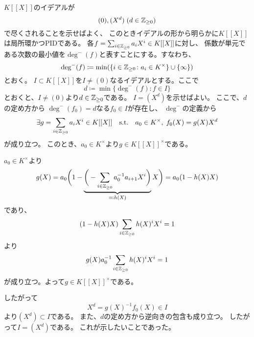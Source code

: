 \documentclass[report]{jlreq}
\begin{document}
\begin{answer}
    $K[[X]]$のイデアルが
    \begin{equation}
        (0), (X^d)\; (d \in \mathbb{Z}_{\ge 0})
    \end{equation}
    で尽くされることを示せばよく、
    このときイデアルの形から明らかに$K[[X]]$は局所環かつPIDである。
    各$f = \sum_{i \in \mathbb{Z}_{\ge 0}} a_i X^i \in K[[X]]$に対し、
    係数が単元である次数の最小値を$\deg^-(f)$と表すことにする。すなわち、
    \begin{equation}
        \operatorname{deg}^-(f) \coloneqq \min (\{
            i \in \mathbb{Z}_{\ge 0} \colon a_i \in K^\times
        \} \cup \{ \infty \})
    \end{equation}
    とおく。
    $I \subset K[[X]]$を$I \neq (0)$なるイデアルとする。ここで
    \begin{equation}
        d \coloneqq \min \{ \deg^-(f) \colon f \in I \}
    \end{equation}
    とおくと、$I \neq (0)$より$d \in \mathbb{Z}_{\ge 0}$である。
    $I = (X^d)$を示せばよい。
    ここで、$d$の定め方から
    $\deg^-(f_0) = d$なる$f_0 \in I$が存在し、
    $\deg^-$の定義から
    \begin{equation}
        \exists g = \sum_{i \in \mathbb{Z}_{\ge 0}} a_i X^i \in K[[X]]
        \quad \text{s.t.} \quad
        a_0 \in K^\times,\;
        f_0(X) = g(X) X^d
    \end{equation}
    が成り立つ。
    このとき、$a_0 \in K^\times$より$g \in K[[X]]^\times$である。
    \begin{innerproof}
        $a_0 \in K^\times$より
        \begin{alignat}{1}
            g(X) = a_0 \bigg(
                1 - \underbrace{
                    \bigg(- \sum_{i \in \mathbb{Z}_{\ge 0}} a_0^{-1} a_{i + 1} X^i \bigg)
                }_{\eqqcolon h(X)}
                X
            \bigg)
                = a_0 (1 - h(X) X)
        \end{alignat}
        であり、
        \begin{equation}
            (1 - h(X) X) \sum_{i \in \mathbb{Z}_{\ge 0}} h(X)^i X^i = 1
        \end{equation}
        より
        \begin{equation}
            g(X) a_0^{-1} \sum_{i \in \mathbb{Z}_{\ge 0}} h(X)^i X^i = 1
        \end{equation}
        が成り立つ。よって$g \in K[[X]]^\times$である。
    \end{innerproof}
    したがって
    \begin{equation}
        X^d = g(X)^{-1} f_0(X) \in I
    \end{equation}
    より$(X^d) \subset I$である。
    また、$d$の定め方から逆向きの包含も成り立つ。
    したがって$I = (X^d)$である。
    これが示したいことであった。
\end{answer}
\end{document}
